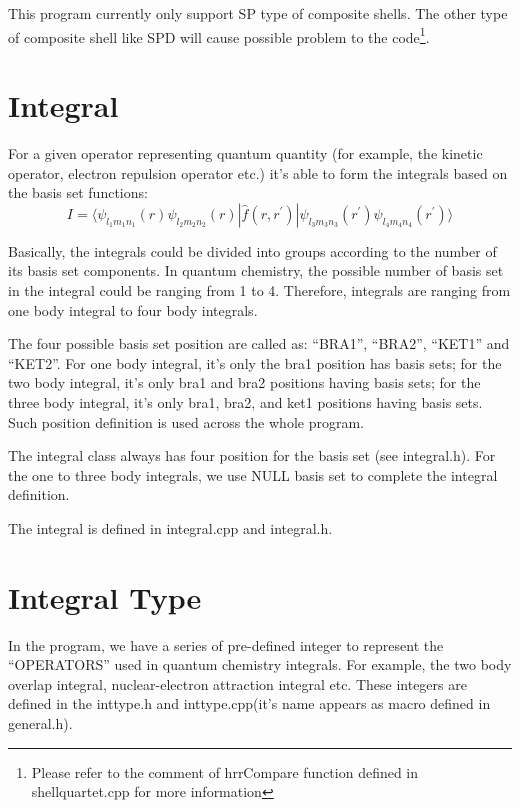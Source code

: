 This program currently only support SP type of composite shells.
The other type of composite shell like SPD will cause possible
problem to the code\footnote{Please refer to the comment of 
hrrCompare function defined in shellquartet.cpp for more information}.

\section{Integral}
%
%
\label{integral}

For a given operator representing quantum quantity (for example,
the kinetic operator, electron repulsion operator etc.) it's able 
to form the integrals based on the basis set functions:
\begin{equation}
 I = \langle \psi_{l_{1}m_{1}n_{1}}(r)\psi_{l_{2}m_{2}n_{2}}(r)| 
 \hat{f}(r,r^{'})| \psi_{l_{3}m_{3}n_{3}}(r^{'})
 \psi_{l_{4}m_{4}n_{4}}(r^{'})\rangle
\end{equation}

Basically, the integrals could be divided into groups according to the number
of its basis set components. In quantum chemistry, the possible
number of basis set in the integral could be ranging from 1 to 
4. Therefore, integrals are ranging from one body integral to 
four body integrals. 

The four possible basis set position are called as: ``BRA1'', ``BRA2'',
``KET1'' and ``KET2''. For one body integral, it's only the bra1
position has basis sets; for the two body integral, it's only 
bra1 and bra2 positions having basis sets; for the three body integral, 
it's only bra1, bra2, and ket1 positions having basis sets. 
Such position definition is used across the whole program.

The integral class always has four position for the basis set (see 
integral.h). For the one to three body integrals, we use NULL
basis set to complete the integral definition.

The integral is defined in integral.cpp and integral.h.

\section{Integral Type}
%
%
\label{inttype}

In the program, we have a series of pre-defined integer to represent 
the ``OPERATORS'' used in quantum chemistry integrals. For example,
the two body overlap integral, nuclear-electron attraction integral
etc. These integers are defined in the inttype.h and inttype.cpp(it's 
name appears as macro defined in general.h).


